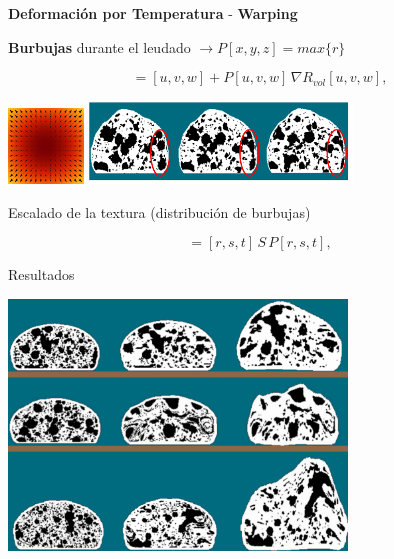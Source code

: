 \documentclass[spanish,unknownkeysallowed,10pt]{beamer}
\begin{document}
\begin{frame}{}
\textbf{Deformación por Temperatura} - \textbf{Warping}




\textbf{Burbujas} durante el leudado $\rightarrow P[x,y,z] = max \bigg\{r\bigg\}$

\begin{equation*}
[r,s,t] = [u,v,w] + P[u,v,w] \, \nabla R_{vol}[u,v,w],
\end{equation*}

\includegraphics[width=2cm]{../figures/gradient}
\includegraphics[width=7cm]{../figures/parameterp}

Escalado de la textura (distribución de burbujas)

\begin{equation*}
[x,y,z] = [r,s,t]\, S \, P[r,s,t],
\end{equation*}

\end{frame}

\begin{frame}{Resultados}

\centerline{\includegraphics[width=9cm]{../figures/Fig9}}

\end{frame}
\end{document}
